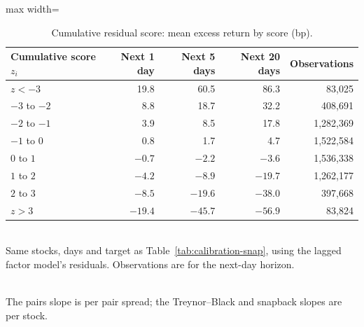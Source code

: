 \documentclass[11pt,letterpaper]{article}
\begin{document}
\begin{table}[!htbp]
    \centering
    \caption{Cumulative residual score: mean excess return by score (bp).}
    \label{tab:calibration-cumulative}
    \begin{adjustbox}{max width=\linewidth}
        \begin{tabular}{lrrrr}
            \toprule
            Cumulative score $z_i$ & Next 1 day & Next 5 days & Next 20 days & Observations \\
            \midrule
            $z < -3$ & 19.8 & 60.5 & 86.3 & 83,025 \\
            $-3$ to $-2$ & 8.8 & 18.7 & 32.2 & 408,691 \\
            $-2$ to $-1$ & 3.9 & 8.5 & 17.8 & 1,282,369 \\
            $-1$ to $0$ & 0.8 & 1.7 & 4.7 & 1,522,584 \\
            $0$ to $1$ & $-0.7$ & $-2.2$ & $-3.6$ & 1,536,338 \\
            $1$ to $2$ & $-4.2$ & $-8.9$ & $-19.7$ & 1,262,177 \\
            $2$ to $3$ & $-8.5$ & $-19.6$ & $-38.0$ & 397,668 \\
            $z > 3$ & $-19.4$ & $-45.7$ & $-56.9$ & 83,824 \\
            \bottomrule
        \end{tabular}
    \end{adjustbox}
    \\[4pt]
    \small Same stocks, days and target as Table~\ref{tab:calibration-snap}, using the lagged
    factor model's residuals. Observations are for the next-day horizon.
\end{table}

\begin{table}[!htbp]
    \centering
    \caption{Return per one standard deviation of signal.}
    \label{tab:calibration-slopes}
    \\[4pt]
    \small The pairs slope is per pair spread; the Treynor--Black and snapback slopes are per stock.
\end{table}
\end{document}
